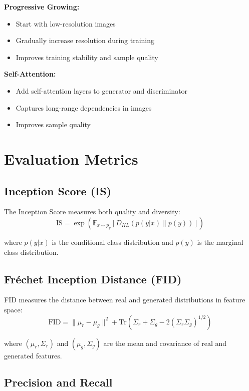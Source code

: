 \textbf{Progressive Growing:}
\begin{itemize}
    \item Start with low-resolution images
    \item Gradually increase resolution during training
    \item Improves training stability and sample quality
\end{itemize}

\textbf{Self-Attention:}
\begin{itemize}
    \item Add self-attention layers to generator and discriminator
    \item Captures long-range dependencies in images
    \item Improves sample quality
\end{itemize}

\section{Evaluation Metrics}

\subsection{Inception Score (IS)}

The Inception Score measures both quality and diversity:
\begin{equation}
    \text{IS} = \exp(\mathbb{E}_{x \sim p_g}[D_{KL}(p(y|x) \| p(y))])
\end{equation}

where $p(y|x)$ is the conditional class distribution and $p(y)$ is the marginal class distribution.

\subsection{Fréchet Inception Distance (FID)}

FID measures the distance between real and generated distributions in feature space:
\begin{equation}
    \text{FID} = \|\mu_r - \mu_g\|^2 + \text{Tr}(\Sigma_r + \Sigma_g - 2(\Sigma_r \Sigma_g)^{1/2})
\end{equation}

where $(\mu_r, \Sigma_r)$ and $(\mu_g, \Sigma_g)$ are the mean and covariance of real and generated features.

\subsection{Precision and Recall}

